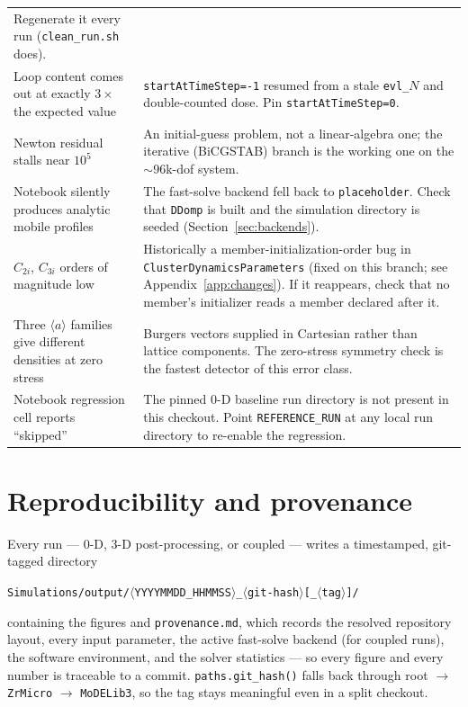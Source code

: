 \documentclass[11pt]{article}
\newcommand{\aloop}{\ensuremath{\langle a\rangle}}
\newcommand{\code}[1]{\texttt{\small #1}}
\newcommand{\file}[1]{\texttt{\footnotesize #1}}
\begin{document}
\begin{longtable}{@{}p{}p{}@{}}
Regenerate it every run (\file{clean\_run.sh} does). \\
Loop content comes out at exactly $3\times$ the expected value &
\code{startAtTimeStep=-1} resumed from a stale \file{evl\_$N$} and
double-counted dose. Pin \code{startAtTimeStep=0}. \\
Newton residual stalls near $10^{5}$ &
An initial-guess problem, not a linear-algebra one; the iterative
(BiCGSTAB) branch is the working one on the $\sim$96k-dof system. \\
Notebook silently produces analytic mobile profiles &
The fast-solve backend fell back to \code{placeholder}. Check that
\code{DDomp} is built and the simulation directory is seeded
(Section~\ref{sec:backends}). \\
$C_{2i}$, $C_{3i}$ orders of magnitude low &
Historically a member-initialization-order bug in
\code{ClusterDynamicsParameters} (fixed on this branch; see
Appendix~\ref{app:changes}). If it reappears, check that no member's
initializer reads a member declared after it. \\
Three \aloop{} families give different densities at zero stress &
Burgers vectors supplied in Cartesian rather than lattice components. The
zero-stress symmetry check is the fastest detector of this error class. \\
Notebook regression cell reports ``skipped'' &
The pinned 0-D baseline run directory is not present in this checkout.
Point \code{REFERENCE\_RUN} at any local run directory to re-enable the
regression. \\
\bottomrule
\end{longtable}

\section{Reproducibility and provenance}
\label{sec:repro}

Every run --- 0-D, 3-D post-processing, or coupled --- writes a timestamped,
git-tagged directory

\begin{center}
\file{Simulations/output/$\langle$YYYYMMDD\_HHMMSS$\rangle$\_$\langle$git-hash$\rangle$[\_$\langle$tag$\rangle$]/}
\end{center}

containing the figures and \file{provenance.md}, which records the resolved
repository layout, every input parameter, the active fast-solve backend
(for coupled runs), the software environment, and the solver statistics ---
so every figure and every number is traceable to a commit.
\code{paths.git\_hash()} falls back through root $\rightarrow$
\file{ZrMicro} $\rightarrow$ \file{MoDELib3}, so the tag stays meaningful even
in a split checkout.
\end{document}
